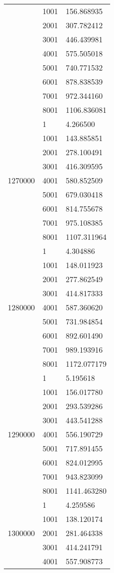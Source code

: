 \begin{table}[htb!]
\begin{tabular}{lll}
 & 1001 & 156.868935 \\
 & 2001 & 307.782412 \\
 & 3001 & 446.439981 \\
 & 4001 & 575.505018 \\
 & 5001 & 740.771532 \\
 & 6001 & 878.838539 \\
 & 7001 & 972.344160 \\
 & 8001 & 1106.836081 \\
\multirow[c]{9}{*}{1270000} & 1 & 4.266500 \\
 & 1001 & 143.885851 \\
 & 2001 & 278.100491 \\
 & 3001 & 416.309595 \\
 & 4001 & 580.852509 \\
 & 5001 & 679.030418 \\
 & 6001 & 814.755678 \\
 & 7001 & 975.108385 \\
 & 8001 & 1107.311964 \\
\multirow[c]{9}{*}{1280000} & 1 & 4.304886 \\
 & 1001 & 148.011923 \\
 & 2001 & 277.862549 \\
 & 3001 & 414.817333 \\
 & 4001 & 587.360620 \\
 & 5001 & 731.984854 \\
 & 6001 & 892.601490 \\
 & 7001 & 989.193916 \\
 & 8001 & 1172.077179 \\
\multirow[c]{9}{*}{1290000} & 1 & 5.195618 \\
 & 1001 & 156.017780 \\
 & 2001 & 293.539286 \\
 & 3001 & 443.541288 \\
 & 4001 & 556.190729 \\
 & 5001 & 717.891455 \\
 & 6001 & 824.012995 \\
 & 7001 & 943.823099 \\
 & 8001 & 1141.463280 \\
\multirow[c]{9}{*}{1300000} & 1 & 4.259586 \\
 & 1001 & 138.120174 \\
 & 2001 & 281.464338 \\
 & 3001 & 414.241791 \\
 & 4001 & 557.908773 \\

\end{tabular}
\end{table}
